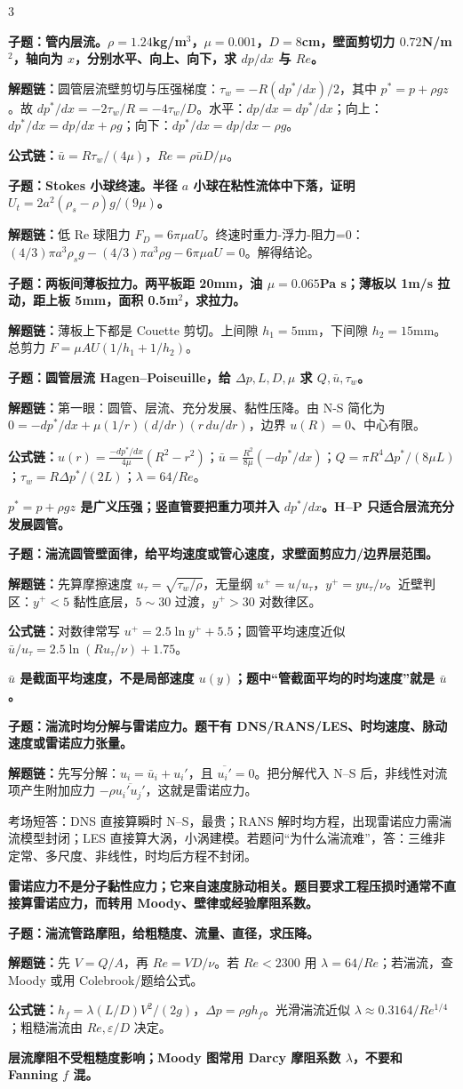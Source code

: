 \documentclass[a4paper]{article}
\newcommand{\qt}[1]{\vspace{0.10pt}\colorbox{Q}{\parbox{\dimexpr\linewidth-2\fboxsep}{\color{white}\bfseries #1}}\par}
\newcommand{\ans}[1]{\colorbox{G}{\parbox{\dimexpr\linewidth-2\fboxsep}{#1}}\par}
\newcommand{\warn}[1]{\colorbox{Y}{\parbox{\dimexpr\linewidth-2\fboxsep}{\color{E}\bfseries #1}}\par}
\newcommand{\chain}[1]{{\color{A}\bfseries 解题链：}#1\par}
\newcommand{\form}[1]{{\color{M}\bfseries 公式链：}#1\par}
\begin{document}
\begin{multicols}{3}
\qt{子题：管内层流。$\rho=1.24$kg/m$^3$，$\mu=0.001$，$D=8$cm，壁面剪切力 $0.72$N/m$^2$，轴向为 $x$，分别水平、向上、向下，求 $dp/dx$ 与 $Re$。}
\chain{圆管层流壁剪切与压强梯度：$\tau_w=-R(dp^*/dx)/2$，其中 $p^*=p+\rho gz$。故 $dp^*/dx=-2\tau_w/R=-4\tau_w/D$。水平：$dp/dx=dp^*/dx$；向上：$dp^*/dx=dp/dx+\rho g$；向下：$dp^*/dx=dp/dx-\rho g$。}
\form{$\bar u=R\tau_w/(4\mu)$，$Re=\rho\bar uD/\mu$。}

\qt{子题：Stokes 小球终速。半径 $a$ 小球在粘性流体中下落，证明 $U_t=2a^2(\rho_s-\rho)g/(9\mu)$。}
\chain{低 Re 球阻力 $F_D=6\pi\mu aU$。终速时重力-浮力-阻力=0：$(4/3)\pi a^3\rho_sg-(4/3)\pi a^3\rho g-6\pi\mu aU=0$。解得结论。}

\qt{子题：两板间薄板拉力。两平板距 20mm，油 $\mu=0.065$Pa s；薄板以 1m/s 拉动，距上板 5mm，面积 0.5m$^2$，求拉力。}
\chain{薄板上下都是 Couette 剪切。上间隙 $h_1=5$mm，下间隙 $h_2=15$mm。总剪力 $F=\mu AU(1/h_1+1/h_2)$。}

\qt{子题：圆管层流 Hagen--Poiseuille，给 $\Delta p,L,D,\mu$ 求 $Q,\bar u,\tau_w$。}
\chain{第一眼：圆管、层流、充分发展、黏性压降。由 N-S 简化为 $0=-dp^*/dx+\mu(1/r)(d/dr)(r\,du/dr)$，边界 $u(R)=0$、中心有限。}
\form{$u(r)=\frac{-dp^*/dx}{4\mu}(R^2-r^2)$；$\bar u=\frac{R^2}{8\mu}(-dp^*/dx)$；$Q=\pi R^4\Delta p^*/(8\mu L)$；$\tau_w=R\Delta p^*/(2L)$；$\lambda=64/Re$。}
\warn{$p^*=p+\rho gz$ 是广义压强；竖直管要把重力项并入 $dp^*/dx$。H--P 只适合层流充分发展圆管。}

\qt{子题：湍流圆管壁面律，给平均速度或管心速度，求壁面剪应力/边界层范围。}
\chain{先算摩擦速度 $u_\tau=\sqrt{\tau_w/\rho}$，无量纲 $u^+=u/u_\tau$，$y^+=yu_\tau/\nu$。近壁判区：$y^+<5$ 黏性底层，$5\sim30$ 过渡，$y^+>30$ 对数律区。}
\form{对数律常写 $u^+=2.5\ln y^+ +5.5$；圆管平均速度近似 $\bar u/u_\tau=2.5\ln(Ru_\tau/\nu)+1.75$。}
\warn{$\bar u$ 是截面平均速度，不是局部速度 $u(y)$；题中“管截面平均的时均速度”就是 $\bar u$。}

\qt{子题：湍流时均分解与雷诺应力。题干有 DNS/RANS/LES、时均速度、脉动速度或雷诺应力张量。}
\chain{先写分解：$u_i=\bar u_i+u_i'$，且 $\overline{u_i'}=0$。把分解代入 N--S 后，非线性对流项产生附加应力 $-\rho\overline{u_i'u_j'}$，这就是雷诺应力。}
\ans{考场短答：DNS 直接算瞬时 N--S，最贵；RANS 解时均方程，出现雷诺应力需湍流模型封闭；LES 直接算大涡，小涡建模。若题问“为什么湍流难”，答：三维非定常、多尺度、非线性，时均后方程不封闭。}
\warn{雷诺应力不是分子黏性应力；它来自速度脉动相关。题目要求工程压损时通常不直接算雷诺应力，而转用 Moody、壁律或经验摩阻系数。}

\qt{子题：湍流管路摩阻，给粗糙度、流量、直径，求压降。}
\chain{先 $V=Q/A$，再 $Re=VD/\nu$。若 $Re<2300$ 用 $\lambda=64/Re$；若湍流，查 Moody 或用 Colebrook/题给公式。}
\form{$h_f=\lambda(L/D)V^2/(2g)$，$\Delta p=\rho gh_f$。光滑湍流近似 $\lambda\approx0.3164/Re^{1/4}$；粗糙湍流由 $Re,\varepsilon/D$ 决定。}
\warn{层流摩阻不受粗糙度影响；Moody 图常用 Darcy 摩阻系数 $\lambda$，不要和 Fanning $f$ 混。}


\end{multicols}
\end{document}

